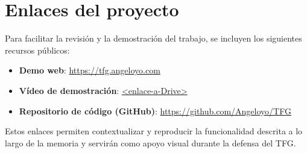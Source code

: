 \section{Enlaces del proyecto}

Para facilitar la revisión y la demostración del trabajo, se incluyen los siguientes recursos públicos:

\begin{itemize}
    \item \textbf{Demo web}: \url{https://tfg.angeloyo.com}
    \item \textbf{Vídeo de demostración}: \url{<enlace-a-Drive>}
    \item \textbf{Repositorio de código (GitHub)}: \url{https://github.com/Angeloyo/TFG}
\end{itemize}

Estos enlaces permiten contextualizar y reproducir la funcionalidad descrita a lo largo de la memoria y servirán como apoyo visual durante la defensa del TFG.

